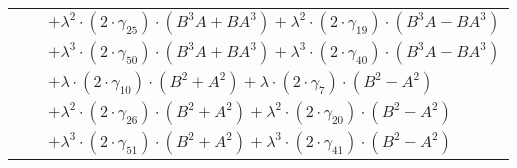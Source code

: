 \documentclass{article}
\begin{document}
\begin{table}[!hp]
\begin{center}
\begin{tabular}{rcl}
 & & $ + {\lambda}^2{\cdot}(2{\cdot}{\gamma}_{25}){\cdot}(B^{3}A+BA^{3}) + {\lambda}^2{\cdot}(2{\cdot}{\gamma}_{19}){\cdot}(B^{3}A-BA^{3})$ \\
 & & $ + {\lambda}^3{\cdot}(2{\cdot}{\gamma}_{50}){\cdot}(B^{3}A+BA^{3}) + {\lambda}^3{\cdot}(2{\cdot}{\gamma}_{40}){\cdot}(B^{3}A-BA^{3})$ \\
 & & $ + {\lambda}{\cdot}(2{\cdot}{\gamma}_{10}){\cdot}(B^{2}+A^{2}) + {\lambda}{\cdot}(2{\cdot}{\gamma}_{7}){\cdot}(B^{2}-A^{2})$ \\
 & & $ + {\lambda}^2{\cdot}(2{\cdot}{\gamma}_{26}){\cdot}(B^{2}+A^{2}) + {\lambda}^2{\cdot}(2{\cdot}{\gamma}_{20}){\cdot}(B^{2}-A^{2})$ \\
 & & $ + {\lambda}^3{\cdot}(2{\cdot}{\gamma}_{51}){\cdot}(B^{2}+A^{2}) + {\lambda}^3{\cdot}(2{\cdot}{\gamma}_{41}){\cdot}(B^{2}-A^{2})$ \\
\end{tabular}
\end{center}
\end{table}

\newpage
\end{document}
